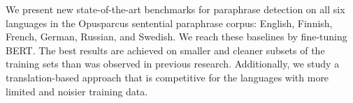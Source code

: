 We present new state-of-the-art benchmarks for paraphrase detection on all six languages in the Opusparcus sentential paraphrase corpus: English, Finnish, French, German, Russian, and Swedish. We reach these baselines by fine-tuning BERT. The best results are achieved on smaller and cleaner subsets of the training sets than was observed in previous research. Additionally, we study a translation-based approach that is competitive for the languages with more limited and noisier training data.
